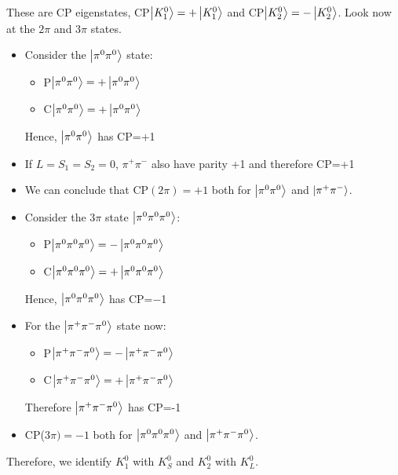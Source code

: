 \documentclass[10.75pt,a4paper,openright,bottom=2cm]{article}
\newcommand{\beginbox}[1]{\begin{tcolorbox}[width=\textwidth,colback={yellow!50},title={#1},colbacktitle={gray!50},coltitle=black]}
\renewcommand{\endbox}{\end{tcolorbox}\noindent}
\begin{document}
These are CP eigenstates, CP$\ket{K_1^0}=+\ket{K_1^0}$ and CP$\ket{K_2^0}=-\ket{K_2^0}$. Look now at the $2\pi$ and $3\pi$ states.
\beginbox{CP Eigenstates}
\begin{multicols}{2}
\begin{itemize}
    \item Consider the $\ket{\pi^0\pi^0}$ state:
    \begin{itemize}
        \item P$\ket{\pi^0\pi^0}=+\ket{\pi^0\pi^0}$
        \item C$\ket{\pi^0\pi^0}=+\ket{\pi^0\pi^0}$
    \end{itemize}
    Hence, $\ket{\pi^0\pi^0}$ has CP=+1
    \item If $L=S_1=S_2=0$, $\pi^+\pi^-$ also have parity +1 and therefore CP=+1
    \item We can conclude that CP$(2\pi)=+1$ both for $\ket{\pi^0\pi^0}$ and $\ket{\pi^+\pi^-}$.
\end{itemize}
\columnbreak
\begin{itemize}
    \item Consider the $3\pi$ state $\ket{\pi^0\pi^0\pi^0}$:
    \begin{itemize}
        \item P$\ket{\pi^0\pi^0\pi^0}=-\ket{\pi^0\pi^0\pi^0}$
        \item C$\ket{\pi^0\pi^0\pi^0}=+\ket{\pi^0\pi^0\pi^0}$
    \end{itemize}
    Hence, $\ket{\pi^0\pi^0\pi^0}$ has CP=$-$1
    \item For the $\ket{\pi^+\pi^-\pi^0}$ state now:
    \begin{itemize}
        \item P$\ket{\pi^+\pi^-\pi^0}=-\ket{\pi^+\pi^-\pi^0}$
        \item C$\ket{\pi^+\pi^-\pi^0}=+\ket{\pi^+\pi^-\pi^0}$
    \end{itemize}
    Therefore $\ket{\pi^+\pi^-\pi^0}$ has CP=-1
    \item CP($3\pi)=-1$ both for $\ket{\pi^0\pi^0\pi^0}$ and $\ket{\pi^+\pi^-\pi^0}$.
\end{itemize}
\end{multicols}
\endbox
Therefore, we identify $K_1^0$ with $K_S^0$ and $K_2^0$ with $K_L^0$.
\end{document}
